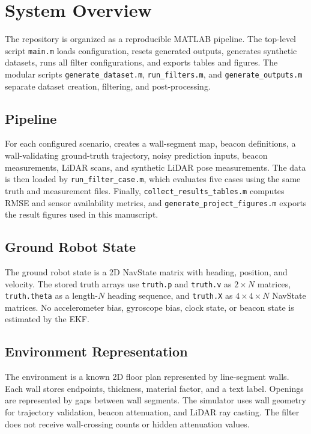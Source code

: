 \section{System Overview}

The repository is organized as a reproducible MATLAB pipeline. The top-level script \texttt{main.m} loads configuration, resets generated outputs, generates synthetic datasets, runs all filter configurations, and exports tables and figures. The modular scripts \texttt{generate\_dataset.m}, \texttt{run\_filters.m}, and \texttt{generate\_outputs.m} separate dataset creation, filtering, and post-processing.

\subsection{Pipeline}

For each configured scenario,  creates a wall-segment map, beacon definitions, a wall-validating ground-truth trajectory, noisy prediction inputs, beacon measurements, LiDAR scans, and synthetic LiDAR pose measurements. The data is then loaded by \texttt{run\_filter\_case.m}, which evaluates five cases using the same truth and measurement files. Finally, \texttt{collect\_results\_tables.m} computes RMSE and sensor availability metrics, and \texttt{generate\_project\_figures.m} exports the result figures used in this manuscript.

\subsection{Ground Robot State}

The ground robot state is a 2D NavState matrix with heading, position, and velocity. The stored truth arrays use \texttt{truth.p} and \texttt{truth.v} as \(2 \times N\) matrices, \texttt{truth.theta} as a length-\(N\) heading sequence, and \texttt{truth.X} as \(4 \times 4 \times N\) NavState matrices. No accelerometer bias, gyroscope bias, clock state, or beacon state is estimated by the EKF.

\subsection{Environment Representation}

The environment is a known 2D floor plan represented by line-segment walls. Each wall stores endpoints, thickness, material factor, and a text label. Openings are represented by gaps between wall segments. The simulator uses wall geometry for trajectory validation, beacon attenuation, and LiDAR ray casting. The filter does not receive wall-crossing counts or hidden attenuation values.

